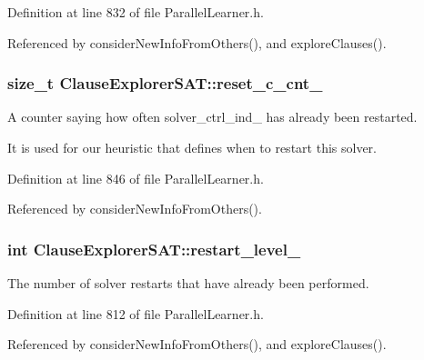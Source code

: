 Definition at line 832 of file Parallel\-Learner.\-h.



Referenced by consider\-New\-Info\-From\-Others(), and explore\-Clauses().

\hypertarget{classClauseExplorerSAT_a9fb3a26a305139346303b705c67dc7be}{
\subsubsection[{reset\-\_\-c\-\_\-cnt\-\_\-}]{\setlength{\rightskip}{0pt plus 5cm}size\-\_\-t Clause\-Explorer\-S\-A\-T\-::reset\-\_\-c\-\_\-cnt\-\_\-\hspace{0.3cm}{\ttfamily [protected]}}}\label{classClauseExplorerSAT_a9fb3a26a305139346303b705c67dc7be}


A counter saying how often solver\-\_\-ctrl\-\_\-ind\-\_\- has already been restarted. 

It is used for our heuristic that defines when to restart this solver. 

Definition at line 846 of file Parallel\-Learner.\-h.



Referenced by consider\-New\-Info\-From\-Others().

\hypertarget{classClauseExplorerSAT_a0b5d716111026dd1cb4efe5855e2fe2f}{
\subsubsection[{restart\-\_\-level\-\_\-}]{\setlength{\rightskip}{0pt plus 5cm}int Clause\-Explorer\-S\-A\-T\-::restart\-\_\-level\-\_\-\hspace{0.3cm}{\ttfamily [protected]}}}\label{classClauseExplorerSAT_a0b5d716111026dd1cb4efe5855e2fe2f}


The number of solver restarts that have already been performed. 



Definition at line 812 of file Parallel\-Learner.\-h.



Referenced by consider\-New\-Info\-From\-Others(), and explore\-Clauses().

